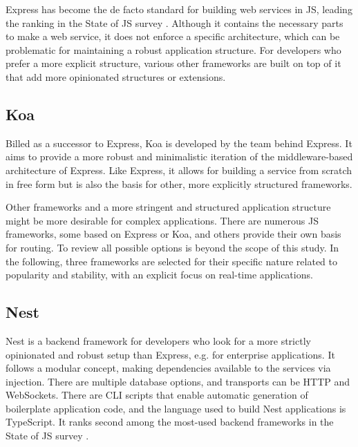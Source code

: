 Express has become the de facto standard for building web services in JS, leading the ranking in the State of JS survey \parencite{mostUsedBackendFrameworks22}. Although it contains the necessary parts to make a web service, it does not enforce a specific architecture, which can be problematic for maintaining a robust application structure. For developers who prefer a more explicit structure, various other frameworks are built on top of it that add more opinionated structures or extensions.

\subsection{Koa}

Billed as a successor to Express, Koa is developed by the team behind Express. It aims to provide a more robust and minimalistic iteration of the middleware-based architecture of Express. Like Express, it allows for building a service from scratch in free form but is also the basis for other, more explicitly structured frameworks.

Other frameworks and a more stringent and structured application structure might be more desirable for complex applications. There are numerous \ac{JS} frameworks, some based on Express or Koa, and others provide their own basis for routing. To review all possible options is beyond the scope of this study. In the following, three frameworks are selected for their specific nature related to popularity and stability, with an explicit focus on real-time applications.



\subsection{Nest}

Nest is a backend framework for developers who look for a more strictly opinionated and robust setup than Express, e.g. for enterprise applications. It follows a modular concept, making dependencies available to the services via injection. There are multiple database options, and transports can be HTTP and WebSockets. There are \ac{CLI} scripts that enable automatic generation of boilerplate application code, and the language used to build Nest applications is TypeScript. It ranks second among the most-used backend frameworks in the State of JS survey \parencite{mostUsedBackendFrameworks22}.

